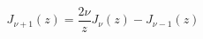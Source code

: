 \documentclass[12pt]{article}
\begin{document}
\begin{displaymath}
J_{\nu+1}(z) = \frac{2\nu}{z}J_\nu(z) - J_{\nu-1}(z)
\end{displaymath}
\end{document}
